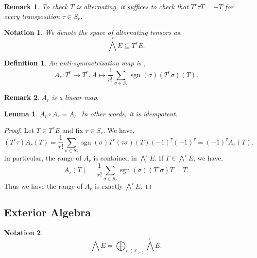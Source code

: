 \documentclass[8pt]{article}
\newtheorem{definition}{Definition}[section]
\newtheorem{lemma}{Lemma}[section]
\newtheorem{notation}{Notation}[section]
\newtheorem{remark}{Remark}[section]
\DeclareMathOperator{\sgn}{sgn}
\newcommand{\Z}[0]{\mathbb{Z}}
\begin{document}
\begin{remark}
  To check $T$ is alternating, it suffices to check that $T^r\tau T = -T$ for every transposition $\tau\in S_r$.
\end{remark}

\begin{notation}
  We denote the space of alternating tensors as,
  \begin{equation*}
    \bigwedge^r E \subseteq T^rE.
  \end{equation*}
\end{notation}

\begin{definition}
  An anti-symmetrization map is ,
  \begin{equation*}
    A_r:T^r\to T^r, A\mapsto {\frac 1 {r!}}\sum_{\sigma\in S_r}\sgn(\sigma) (T^r\sigma)(T).
  \end{equation*}
\end{definition}

\begin{remark}
  $A_r$ is a linear map.
\end{remark}

\begin{lemma}
  $A_r\circ A_r = A_r$. In other words, it is idempotent.
\end{lemma}

\begin{proof}
  Let $T\in T^rE$ and fix $\tau\in S_r$. We have,
  \begin{equation*}
    (T^r\tau)A_r(T) = {\frac 1 {r!}}\sum_{\sigma\in S_r}\sgn(\sigma) T^r(\tau\sigma)(T)(-1)^{\tau}(-1)^{\tau} = (-1)^\tau A_r(T).
  \end{equation*}
  In particular, the range of $A_r$ is contained in $\bigwedge^r E$. If $T\in\bigwedge^rE$, we have,
  \begin{equation*}
    A_r(T) = {\frac 1 {r!}}\sum_{\sigma\in S_r} \sgn(\sigma)(T^r\sigma) T = T.
  \end{equation*}
  Thus we have the range of $A_r$ is exactly $\bigwedge^rE$.
\end{proof}

\subsection{Exterior Algebra}

\begin{notation}
  \begin{equation*}
    \bigwedge E = \bigoplus_{r\in\Z_{\geq0}}\bigwedge^rE.
  \end{equation*}
\end{notation}
\end{document}

